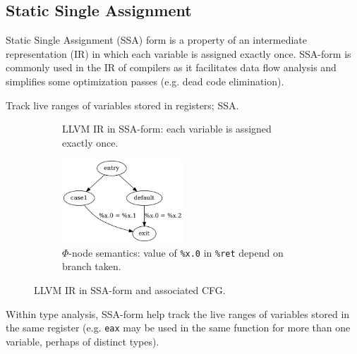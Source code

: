
\subsection{Static Single Assignment}

Static Single Assignment (SSA) form is a property of an intermediate representation (IR) in which each variable is assigned exactly once. SSA-form is commonly used in the IR of compilers as it facilitates data flow analysis and simplifies some optimization passes (e.g. dead code elimination).


Track live ranges of variables stored in registers; SSA.


\begin{figure}[htbp]
	\centering
	\begin{subfigure}[ht]{0.50\textwidth}
		
		\caption{LLVM IR in SSA-form: each variable is assigned exactly once.}
		\label{fig:ssa_form}
	\end{subfigure}
	\begin{subfigure}[ht]{0.50\textwidth}
		\centering
		\includegraphics[width=0.50\textwidth]{inc/phi.png}
		\caption{$\Phi$-node semantics: value of \texttt{\%x.0} in \texttt{\%ret} depend on branch taken.}
		\label{fig:phi_node_semantics}
	\end{subfigure}
	\caption{LLVM IR in SSA-form and associated CFG.}
\end{figure}


Within type analysis, SSA-form help track the live ranges of variables stored in the same register (e.g. \texttt{eax} may be used in the same function for more than one variable, perhaps of distinct types).
